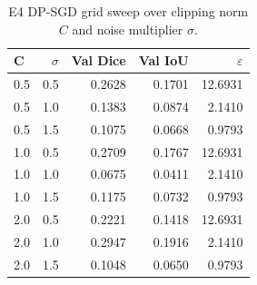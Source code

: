 \begin{table}[t]
\centering
\begin{tabular}{lrrrr}
\toprule
C & $\sigma$ & Val Dice & Val IoU & $\varepsilon$ \\
\midrule
0.5 & 0.5 & 0.2628 & 0.1701 & 12.6931 \\
0.5 & 1.0 & 0.1383 & 0.0874 & 2.1410 \\
0.5 & 1.5 & 0.1075 & 0.0668 & 0.9793 \\
1.0 & 0.5 & 0.2709 & 0.1767 & 12.6931 \\
1.0 & 1.0 & 0.0675 & 0.0411 & 2.1410 \\
1.0 & 1.5 & 0.1175 & 0.0732 & 0.9793 \\
2.0 & 0.5 & 0.2221 & 0.1418 & 12.6931 \\
2.0 & 1.0 & 0.2947 & 0.1916 & 2.1410 \\
2.0 & 1.5 & 0.1048 & 0.0650 & 0.9793 \\
\bottomrule
\end{tabular}
\caption{E4 DP-SGD grid sweep over clipping norm $C$ and noise multiplier $\sigma$.}
\label{tab:e4-dpsgd-sweep}
\end{table}
